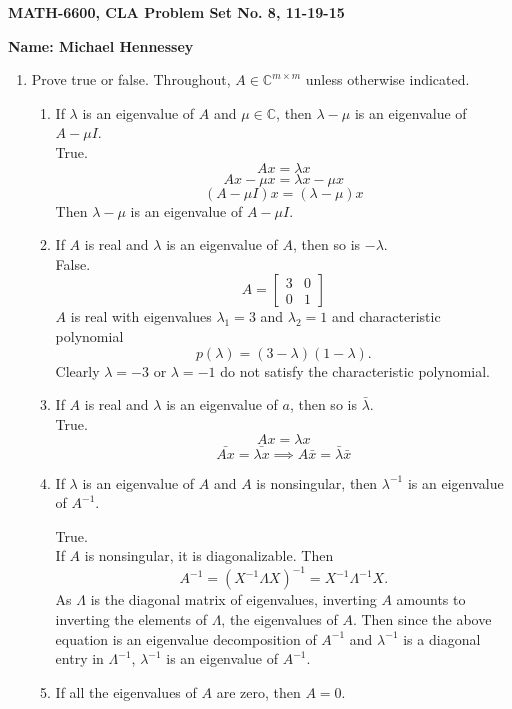 \documentclass[12pt]{article}
\numberwithin{equation}{section}
\begin{document}
{\large\bf MATH-6600, CLA Problem Set No. 8, 11-19-15}



\vspace{6 ex}

{\bf Name: Michael Hennessey} \hfill

\vspace{6 ex}

\begin{enumerate}
\item Prove true or false. Throughout, $A\in\mathbb{C}^{m\times m}$ unless otherwise indicated.
    \begin{enumerate}
    \item If $\lambda$ is an eigenvalue of $A$ and $\mu\in\mathbb{C}$, then $\lambda-\mu$ is an eigenvalue of $A-\mu I$.\\

        True.
        $$Ax=\lambda x$$
        $$Ax-\mu x=\lambda x-\mu x$$
        $$(A-\mu I)x=(\lambda -\mu)x$$
        Then $\lambda-\mu$ is an eigenvalue of $A-\mu I$.
    \item If $A$ is real and $\lambda$ is an eigenvalue of $A$, then so is $-\lambda$.\\

    False.
    $$A=\left[\begin{array}{cc}3&0\\0&1\end{array}\right]$$
    $A$ is real with eigenvalues $\lambda_1=3$ and $\lambda_2=1$ and characteristic polynomial
    $$p(\lambda)=(3-\lambda)(1-\lambda).$$
    Clearly $\lambda=-3$ or $\lambda=-1$ do not satisfy the characteristic polynomial.
    \item If $A$ is real and $\lambda$ is an eigenvalue of $a$, then so is $\bar{\lambda}$.\\

    True.
    $$Ax=\lambda x$$
    $$\bar{Ax}=\bar{\lambda x}\implies A\bar{x}=\bar{\lambda}\bar{x}$$
    \item If $\lambda$ is an eigenvalue of $A$ and $A$ is nonsingular, then $\lambda^{-1}$ is an eigenvalue of $A^{-1}$.

        True.\\
        If $A$ is nonsingular, it is diagonalizable. Then
        $$A^{-1}=(X^{-1}\Lambda X)^{-1}=X^{-1}\Lambda^{-1} X.$$
        As $\Lambda$ is the diagonal matrix of eigenvalues, inverting $A$ amounts to inverting the elements of $\Lambda$, the eigenvalues of $A$. Then since the above equation is an eigenvalue decomposition of $A^{-1}$ and $\lambda^{-1}$ is a diagonal entry in $\Lambda^{-1}$, $\lambda^{-1}$ is an eigenvalue of $A^{-1}$.
    \item If all the eigenvalues of $A$ are zero, then $A=0$.\\


\end{enumerate}
\end{enumerate}
\end{document}
